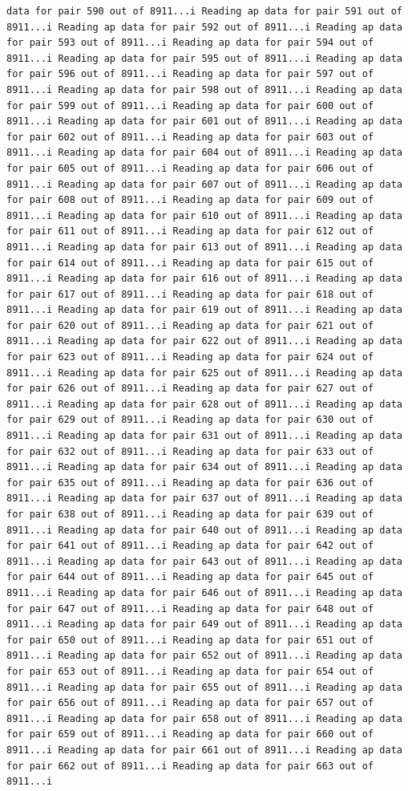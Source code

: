 \documentclass[
]{article}
\begin{document}
\begin{verbatim}
data for pair 590 out of 8911...i Reading ap data for pair 591 out of 8911...i Reading ap data for pair 592 out of 8911...i Reading ap data for pair 593 out of 8911...i Reading ap data for pair 594 out of 8911...i Reading ap data for pair 595 out of 8911...i Reading ap data for pair 596 out of 8911...i Reading ap data for pair 597 out of 8911...i Reading ap data for pair 598 out of 8911...i Reading ap data for pair 599 out of 8911...i Reading ap data for pair 600 out of 8911...i Reading ap data for pair 601 out of 8911...i Reading ap data for pair 602 out of 8911...i Reading ap data for pair 603 out of 8911...i Reading ap data for pair 604 out of 8911...i Reading ap data for pair 605 out of 8911...i Reading ap data for pair 606 out of 8911...i Reading ap data for pair 607 out of 8911...i Reading ap data for pair 608 out of 8911...i Reading ap data for pair 609 out of 8911...i Reading ap data for pair 610 out of 8911...i Reading ap data for pair 611 out of 8911...i Reading ap data for pair 612 out of 8911...i Reading ap data for pair 613 out of 8911...i Reading ap data for pair 614 out of 8911...i Reading ap data for pair 615 out of 8911...i Reading ap data for pair 616 out of 8911...i Reading ap data for pair 617 out of 8911...i Reading ap data for pair 618 out of 8911...i Reading ap data for pair 619 out of 8911...i Reading ap data for pair 620 out of 8911...i Reading ap data for pair 621 out of 8911...i Reading ap data for pair 622 out of 8911...i Reading ap data for pair 623 out of 8911...i Reading ap data for pair 624 out of 8911...i Reading ap data for pair 625 out of 8911...i Reading ap data for pair 626 out of 8911...i Reading ap data for pair 627 out of 8911...i Reading ap data for pair 628 out of 8911...i Reading ap data for pair 629 out of 8911...i Reading ap data for pair 630 out of 8911...i Reading ap data for pair 631 out of 8911...i Reading ap data for pair 632 out of 8911...i Reading ap data for pair 633 out of 8911...i Reading ap data for pair 634 out of 8911...i Reading ap data for pair 635 out of 8911...i Reading ap data for pair 636 out of 8911...i Reading ap data for pair 637 out of 8911...i Reading ap data for pair 638 out of 8911...i Reading ap data for pair 639 out of 8911...i Reading ap data for pair 640 out of 8911...i Reading ap data for pair 641 out of 8911...i Reading ap data for pair 642 out of 8911...i Reading ap data for pair 643 out of 8911...i Reading ap data for pair 644 out of 8911...i Reading ap data for pair 645 out of 8911...i Reading ap data for pair 646 out of 8911...i Reading ap data for pair 647 out of 8911...i Reading ap data for pair 648 out of 8911...i Reading ap data for pair 649 out of 8911...i Reading ap data for pair 650 out of 8911...i Reading ap data for pair 651 out of 8911...i Reading ap data for pair 652 out of 8911...i Reading ap data for pair 653 out of 8911...i Reading ap data for pair 654 out of 8911...i Reading ap data for pair 655 out of 8911...i Reading ap data for pair 656 out of 8911...i Reading ap data for pair 657 out of 8911...i Reading ap data for pair 658 out of 8911...i Reading ap data for pair 659 out of 8911...i Reading ap data for pair 660 out of 8911...i Reading ap data for pair 661 out of 8911...i Reading ap data for pair 662 out of 8911...i Reading ap data for pair 663 out of 8911...i 
\end{verbatim}
\end{document}
